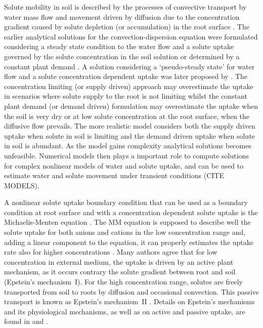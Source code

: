 Solute mobility in soil is described by the processes of convective transport by water mass flow and movement driven by diffusion due to the concentration gradient caused by solute depletion (or accumulation) in the root surface \citep{barber62}.
The earlier analytical solutions for the convection-dispersion equation were formulated considering a steady state condition to the water flow and a solute uptake governed by the solute concentration in the soil solution \citep{barber74,cushman,nye} or determined by a constant plant demand \citep{willigen81}.
A solution considering a `pseudo-steady state' for water flow and a solute concentration dependent uptake was later proposed by \cite{roose}.
The concentration limiting (or supply driven) approach may overestimate the uptake in scenarios where solute supply to the root is not limiting \citep{barraclough} whilst the constant plant demand (or demand driven) formulation may overestimate the uptake when the soil is very dry or at low solute concentration at the root surface, when the diffusive flow prevails.
The more realistic model considers both the supply driven uptake when solute in soil is limiting and the demand driven uptake when solute in soil is abundant.
As the model gains complexity analytical solutions becomes unfeasible.
Numerical models then plays a important role to compute solutions for complex nonlinear models of water and solute uptake, and can be used to estimate water and solute movement under transient conditions (CITE MODELS).

A nonlinear solute uptake boundary condition that can be used as a boundary condition at root surface and with a concentration dependent solute uptake is the Michaelis-Menten equation \citep{barber,barber81,schroder,simunek}.
The MM equation is supposed to describe well the solute uptake for both anions \citep{epstein72,siddiqi,wang} and cations \citep{broadley,kelly,kochian,lux,sadana} in the low concentration range and, adding a linear component to the equation, it can properly estimates the uptake rate also for higher concentrations \citep{borstlap,broadley,epstein72,kochian,vallejo,wang}.
Many authors agree that for low concentration in external medium, the uptake is driven by an active plant mechanism, as it occurs contrary the solute gradient between root and soil (Epstein's mechanism~I). 
For the high concentration range, solutes are freely transported from soil to roots by diffusion and occasional convection. This passive transport is known as Epstein's mechanism~II \citep{kochian,siddiqi}. 
Details on Epstein's mechanisms and its physiological mechanisms, as well as on active and passive uptake, are found in \cite{epstein60} and \cite{fried}.

